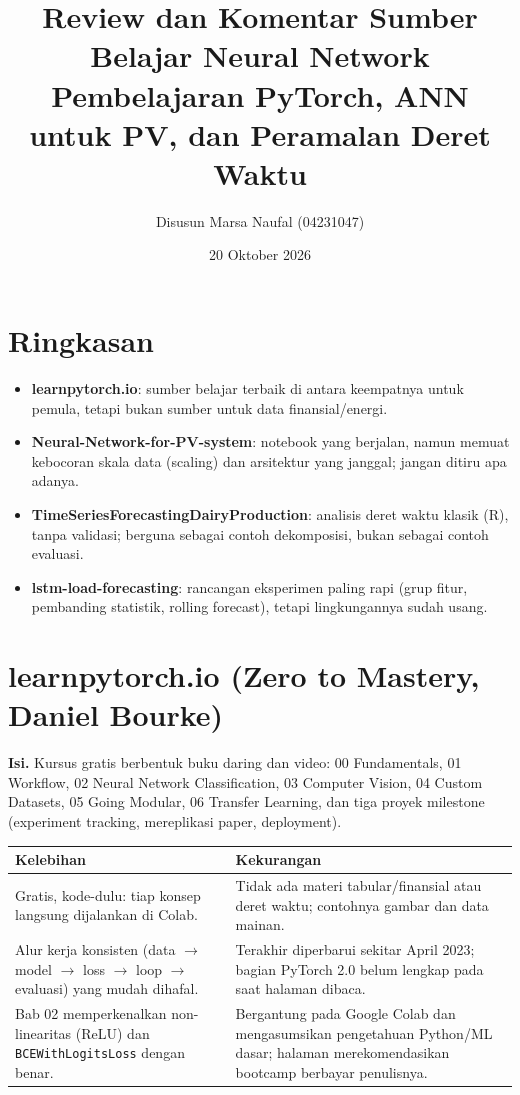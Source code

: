 \documentclass[11pt,a4paper]{article}
\title{Review dan Komentar Sumber Belajar Neural Network\\[2pt]\large Pembelajaran PyTorch, ANN untuk PV, dan Peramalan Deret Waktu}
\author{Disusun Marsa Naufal (04231047)}
\date{20 Oktober 2026}
\newcommand{\ok}[1]{\textcolor{green!40!black}{#1}}
\newcommand{\bad}[1]{\textcolor{red!70!black}{#1}}
\begin{document}
\maketitle

\section*{Ringkasan}

\begin{itemize}
  \item \textbf{learnpytorch.io}: sumber belajar terbaik di antara keempatnya untuk pemula, tetapi bukan sumber untuk data finansial/energi.
  \item \textbf{Neural-Network-for-PV-system}: notebook yang berjalan, namun memuat \bad{kebocoran skala data (scaling) dan arsitektur yang janggal}; jangan ditiru apa adanya.
  \item \textbf{TimeSeriesForecastingDairyProduction}: analisis deret waktu klasik (R), tanpa validasi; berguna sebagai contoh dekomposisi, bukan sebagai contoh evaluasi.
  \item \textbf{lstm-load-forecasting}: rancangan eksperimen paling rapi (grup fitur, pembanding statistik, rolling forecast), tetapi lingkungannya sudah usang.
\end{itemize}

\section{learnpytorch.io (Zero to Mastery, Daniel Bourke)}
\textbf{Isi.} Kursus gratis berbentuk buku daring dan video: 00 Fundamentals, 01 Workflow, 02 Neural Network Classification, 03 Computer Vision, 04 Custom Datasets, 05 Going Modular, 06 Transfer Learning, dan tiga proyek milestone (experiment tracking, mereplikasi paper, deployment).

\begin{tabular}{@{}>{\raggedright\arraybackslash}p{}>{\raggedright\arraybackslash}p{}@{}}
\toprule
\textbf{Kelebihan} & \textbf{Kekurangan} \\
\midrule
\ok{Gratis, kode-dulu}: tiap konsep langsung dijalankan di Colab. &
\bad{Tidak ada materi tabular/finansial} atau deret waktu; contohnya gambar dan data mainan. \\
Alur kerja konsisten (data $\rightarrow$ model $\rightarrow$ loss $\rightarrow$ loop $\rightarrow$ evaluasi) yang mudah dihafal. &
Terakhir diperbarui sekitar April 2023; bagian PyTorch 2.0 belum lengkap pada saat halaman dibaca. \\
Bab 02 memperkenalkan non-linearitas (ReLU) dan \texttt{BCEWithLogitsLoss} dengan benar. &
Bergantung pada Google Colab dan mengasumsikan pengetahuan Python/ML dasar; halaman merekomendasikan bootcamp berbayar penulisnya. \\
\bottomrule
\end{tabular}
\end{document}
